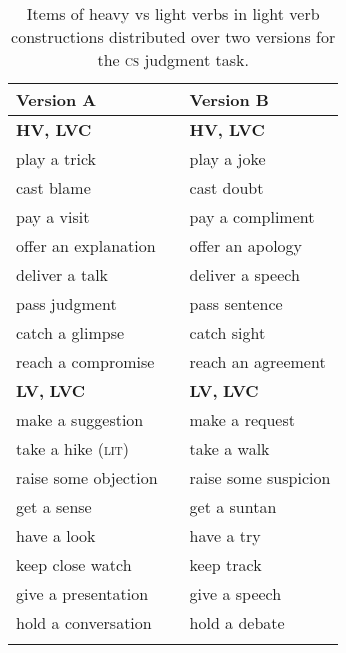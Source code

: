\begin{table}
\caption{Items of heavy vs light verbs in light verb constructions distributed over two versions for the \textsc{cs} judgment task. }
\label{tab:app2}
 \begin{tabular}{lll} %
  \lsptoprule
         \textbf{Version A} &  & \textbf{Version B} \\ %
  \midrule
  \textbf{HV, LVC} &  & \textbf{HV, LVC}\\
 play a trick &  & play a joke \\
 cast blame &  & cast doubt \\
 pay a visit &  & pay a compliment \\
 offer an explanation &  & offer an apology\\
 deliver a talk &  & deliver a speech\\
 pass judgment &  & pass sentence \\
 catch a glimpse &  & catch sight \\
 reach a compromise &  & reach an agreement\\  \midrule
 \textbf{LV,} \textbf{LVC} &  & \textbf{LV,} \textbf{LVC}\\ 
 make a suggestion &  & make a request\\
 take a hike (\textsc{lit}) &  & take a walk\\
 raise some objection &  & raise some suspicion\\
 get a sense &  & get a suntan\\
 have a look &  & have a try \\
 keep close watch &  & keep track \\
 give a presentation &  & give a speech\\
 hold a conversation &  & hold a debate\\
  \lspbottomrule
 \end{tabular}
\end{table}